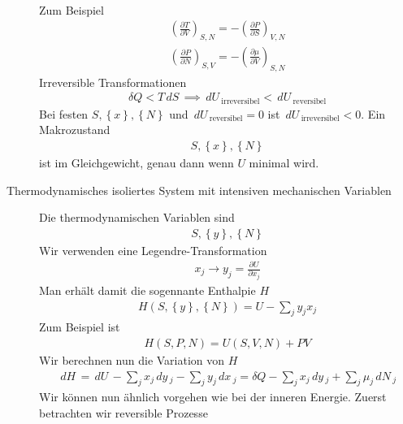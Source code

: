\documentclass[11pt]{article}
\theoremstyle{plain}
\theoremstyle{mytheoremstyle}
\newcommand{\pd}[2]{\frac{\partial #1 }{\partial #2}}
\renewcommand{\d}[1]{\,d#1\,}
\begin{document}
\begin{description}
\begin{align*}
    \end{align*}
    Zum Beispiel
    \begin{align*}
      \left( \pd{T}{V} \right)_{S, N} = - \left( \pd{P}{S} \right)_{V, N}
    \end{align*}
    \begin{align*}
      \left( \pd{P}{N} \right)_{S, V} = - \left( \pd{\mu}{V} \right)_{S, N}
    \end{align*}
    Irreversible Transformationen 
    \begin{align*}
      \delta Q < T \d{S} \implies \d{U}_{\text{irreversibel}} < \d{U}_{\text{reversibel}}
    \end{align*}
    Bei festen $S, \left\{ x \right\}, \left\{ N \right\}$ und $ \d{U}_{\text{reversibel}} = 0 $
    ist $ \d{U}_{\text{irreversibel}} < 0$.
    Ein Makrozustand 
    \begin{align*}
      S, \left\{ x \right\}, \left\{ N \right\}
    \end{align*}
    ist im Gleichgewicht, genau dann wenn $U$ minimal wird.
  \item[Thermodynamisches isoliertes System mit intensiven mechanischen Variablen]
    Die thermodynamischen Variablen sind
    \begin{align*}
      S, \left\{ y \right\}, \left\{ N \right\}
    \end{align*}
    Wir verwenden eine Legendre-Transformation
    \begin{align*}
      x_j \to y_j = \pd{U}{x_j}
    \end{align*}
    Man erhält damit die sogennante Enthalpie $H$
    \begin{align*}
      H(S, \left\{ y \right\}, \left\{ N \right\} ) = U -
      \sum_{j}^{} y_j x_j
    \end{align*}
    Zum Beispiel ist
    \begin{align*}
      H(S, P, N) = U(S, V, N) + PV 
    \end{align*}
    Wir berechnen nun die Variation von $H$
    \begin{align*}
      \d{H}  = \d{U} - \sum_{j}^{} x_j \d{y}_j - \sum_{j}^{} y_j \d{x}_j 
      = \delta Q - \sum_{j}^{} x_j \d{y}_j + \sum_{j}^{} \mu_j \d{N}_j
    \end{align*}
    Wir können nun ähnlich vorgehen wie bei der inneren Energie.
    Zuerst betrachten wir reversible Prozesse
    \begin{align*}

\end{align*}
\end{description}
\end{document}
